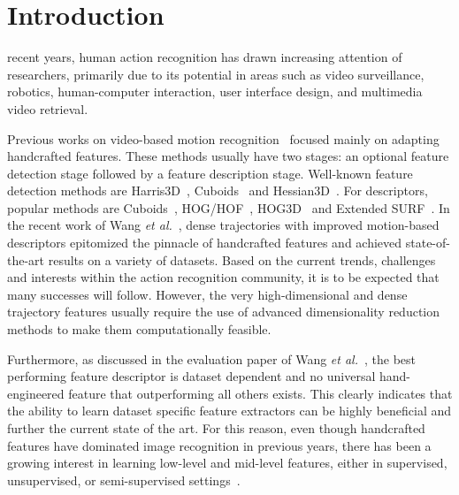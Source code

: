 

\section{Introduction}
\label{sec:introduction}

 recent years, human action recognition has drawn increasing attention of researchers, primarily due to its potential in areas such as video surveillance, robotics, human-computer interaction, user interface design, and multimedia video retrieval.

Previous works on video-based motion recognition~\cite{liuli,xiantong,diwu2} focused mainly on adapting handcrafted features. %
These methods usually have two stages: an optional feature detection stage followed by a feature description stage. Well-known feature detection methods are Harris3D~\cite{laptev2005space}, Cuboids~\cite{dollar2005behavior} and Hessian3D~\cite{hession3d}. For descriptors, popular methods are Cuboids~\cite{scovanner20073}, HOG/HOF~\cite{laptev2005space}, HOG3D~\cite{klaser:inria-00514853} and Extended SURF~\cite{hession3d}.
In the recent work of Wang \textit{et al.}~\cite{wang2013dense}, dense trajectories with improved motion-based descriptors epitomized the pinnacle of handcrafted features and achieved state-of-the-art results on a variety of datasets.
Based on the current trends, challenges and interests within the action recognition community, it is to be expected that many successes will follow. However, the very high-dimensional and dense trajectory features usually require the use of advanced dimensionality reduction methods to make them computationally feasible.

Furthermore, as discussed in the evaluation paper of Wang \emph{et al.}~\cite{wang2009evaluation}, the best performing feature descriptor is dataset dependent and no universal hand-engineered feature that outperforming all others exists. This clearly indicates that the ability to learn dataset specific feature extractors can be highly beneficial and further the current state of the art.
For this reason, even though handcrafted features have dominated image recognition in previous years, there has been a growing interest in learning low-level and mid-level features, either in supervised, unsupervised, or semi-supervised settings~\cite{taylor2010convolutional,le2011learning,baccouche2005spatio}.


